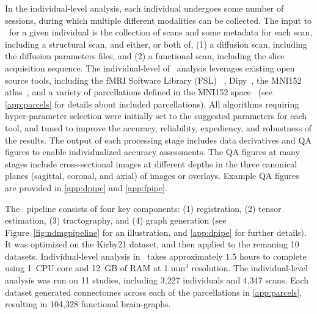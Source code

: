 \documentclass[11pt]{article}
\begin{document}
In the individual-level analysis, each individual  undergoes some number of sessions, during which multiple different modalities can be collected.
The input to \ndmg~for a given individual is  the collection of scans and some metadata for each scan, including a structural scan, %
and either, or both of, (1) a diffusion scan, including the diffusion parameters files,  and (2) a functional scan, including the slice acquisition sequence.
The individual-level of \ndmg~analysis leverages existing open source tools, including
the fMRI Software Library (FSL) ~\cite{fsl1, fsl2, fsl3}, Dipy~\cite{dipy}, the MNI152 atlas~\cite{mni152}, and a variety of parcellations defined in the MNI152 space~\cite{desikan, aal, jhu, harvardoxford, talairach, slab907, slab1068, pvt, glasser} (see \ref{app:parcels} for details about included parcellations). 
All algorithms requiring hyper-parameter selection were initially set to the suggested parameters for each tool, and tuned to improve the accuracy, reliability, expediency, and robustness of the results.
The output of each processing stage includes data derivatives and QA figures to enable individualized accuracy assessments.
The QA figures at many stages include cross-sectional images at different depths in the three canonical planes (sagittal, coronal, and axial) of images or overlays. Example QA figures are provided in \ref{app:dpipe} and \ref{app:fpipe}.


The \ndmgd~pipeline consists of four key components: (1) registration, (2) tensor estimation, (3) tractography, and (4) graph generation (see Figure~\ref{fig:ndmgpipeline} for an illustration, and 
\ref{app:dpipe} for further details). It was optimized on the Kirby21 dataset, and then applied to the remaning 10 datasets.
Individual-level analysis in \ndmgd~takes approximately $1.5$ hours to complete using 1~CPU core and 12~GB of RAM at 1 mm$^3$ resolution.
The individual-level analysis was run on 11 studies, including 3,227 individuals and 4,347 scans. Each dataset generated connectomes across each of the parcellations in \ref{app:parcels}, resulting in 104,328 functional brain-graphs.
\end{document}
